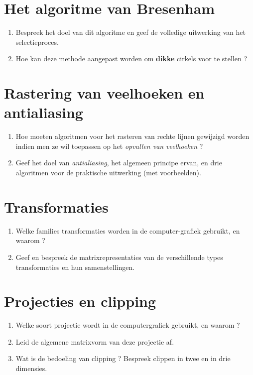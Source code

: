 \documentclass{report}
\begin{document}
	\section{Het algoritme van Bresenham}
	\begin{enumerate}
		\item Bespreek het doel van dit algoritme en geef de volledige uitwerking van het selectieproces. 
		
		\item Hoe kan deze methode aangepast worden om \textbf{dikke} cirkels voor te stellen ? 
	\end{enumerate}

	\section{Rastering van veelhoeken en antialiasing}
	\begin{enumerate}
		\item Hoe moeten algoritmen voor het rasteren van rechte lijnen gewijzigd worden indien men ze wil toepassen op het \textit{opvullen van veelhoeken} ? 
		
		\item Geef het doel van \textit{antialiasing}, het algemeen principe ervan, en drie algoritmen voor de praktische uitwerking (met voorbeelden). 
	\end{enumerate}

	\section{Transformaties}
	\begin{enumerate}
	\item Welke families transformaties worden in de computer-grafiek gebruikt, en waarom ?
	
	\item Geef en bespreek de matrixrepresentaties van de verschillende types transformaties en hun samenstellingen. 
	\end{enumerate}

	\section{Projecties en clipping}

	\begin{enumerate}
	\item Welke soort projectie wordt in de computergrafiek gebruikt, en waarom ?
	
	\item Leid de algemene matrixvorm van deze projectie af. 
	
	\item Wat is de bedoeling van clipping ? Bespreek clippen in twee en in drie dimensies. 
	\end{enumerate}
\end{document}

